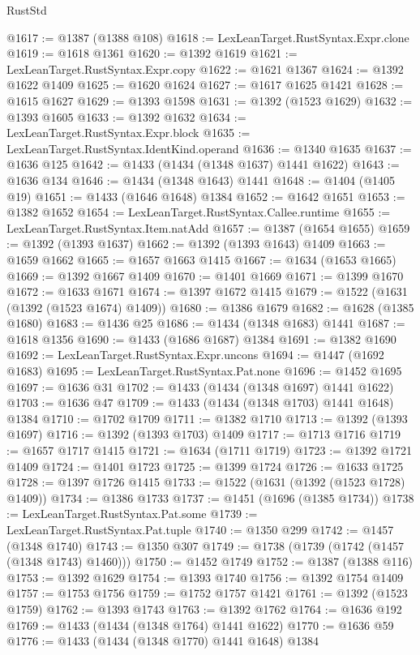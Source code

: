 \begin{lexlean}{RustStd}
\begin{coremodule}
@1617 := @1387 (@1388 @108)
@1618 := LexLeanTarget.RustSyntax.Expr.clone
@1619 := @1618 @1361
@1620 := @1392 @1619
@1621 := LexLeanTarget.RustSyntax.Expr.copy
@1622 := @1621 @1367
@1624 := @1392 @1622 @1409
@1625 := @1620 @1624
@1627 := @1617 @1625 @1421
@1628 := @1615 @1627
@1629 := @1393 @1598
@1631 := @1392 (@1523 @1629)
@1632 := @1393 @1605
@1633 := @1392 @1632
@1634 := LexLeanTarget.RustSyntax.Expr.block
@1635 := LexLeanTarget.RustSyntax.IdentKind.operand
@1636 := @1340 @1635
@1637 := @1636 @125
@1642 := @1433 (@1434 (@1348 @1637) @1441 @1622)
@1643 := @1636 @134
@1646 := @1434 (@1348 @1643) @1441
@1648 := @1404 (@1405 @19)
@1651 := @1433 (@1646 @1648) @1384
@1652 := @1642 @1651
@1653 := @1382 @1652
@1654 := LexLeanTarget.RustSyntax.Callee.runtime
@1655 := LexLeanTarget.RustSyntax.Item.natAdd
@1657 := @1387 (@1654 @1655)
@1659 := @1392 (@1393 @1637)
@1662 := @1392 (@1393 @1643) @1409
@1663 := @1659 @1662
@1665 := @1657 @1663 @1415
@1667 := @1634 (@1653 @1665)
@1669 := @1392 @1667 @1409
@1670 := @1401 @1669
@1671 := @1399 @1670
@1672 := @1633 @1671
@1674 := @1397 @1672 @1415
@1679 := @1522 (@1631 (@1392 (@1523 @1674) @1409))
@1680 := @1386 @1679
@1682 := @1628 (@1385 @1680)
@1683 := @1436 @25
@1686 := @1434 (@1348 @1683) @1441
@1687 := @1618 @1356
@1690 := @1433 (@1686 @1687) @1384
@1691 := @1382 @1690
@1692 := LexLeanTarget.RustSyntax.Expr.uncons
@1694 := @1447 (@1692 @1683)
@1695 := LexLeanTarget.RustSyntax.Pat.none
@1696 := @1452 @1695
@1697 := @1636 @31
@1702 := @1433 (@1434 (@1348 @1697) @1441 @1622)
@1703 := @1636 @47
@1709 := @1433 (@1434 (@1348 @1703) @1441 @1648) @1384
@1710 := @1702 @1709
@1711 := @1382 @1710
@1713 := @1392 (@1393 @1697)
@1716 := @1392 (@1393 @1703) @1409
@1717 := @1713 @1716
@1719 := @1657 @1717 @1415
@1721 := @1634 (@1711 @1719)
@1723 := @1392 @1721 @1409
@1724 := @1401 @1723
@1725 := @1399 @1724
@1726 := @1633 @1725
@1728 := @1397 @1726 @1415
@1733 := @1522 (@1631 (@1392 (@1523 @1728) @1409))
@1734 := @1386 @1733
@1737 := @1451 (@1696 (@1385 @1734))
@1738 := LexLeanTarget.RustSyntax.Pat.some
@1739 := LexLeanTarget.RustSyntax.Pat.tuple
@1740 := @1350 @299
@1742 := @1457 (@1348 @1740)
@1743 := @1350 @307
@1749 := @1738 (@1739 (@1742 (@1457 (@1348 @1743) @1460)))
@1750 := @1452 @1749
@1752 := @1387 (@1388 @116)
@1753 := @1392 @1629
@1754 := @1393 @1740
@1756 := @1392 @1754 @1409
@1757 := @1753 @1756
@1759 := @1752 @1757 @1421
@1761 := @1392 (@1523 @1759)
@1762 := @1393 @1743
@1763 := @1392 @1762
@1764 := @1636 @192
@1769 := @1433 (@1434 (@1348 @1764) @1441 @1622)
@1770 := @1636 @59
@1776 := @1433 (@1434 (@1348 @1770) @1441 @1648) @1384

\end{coremodule}
\end{lexlean}
